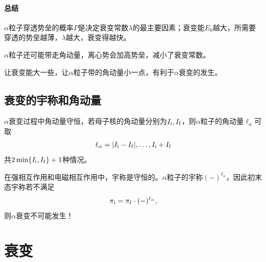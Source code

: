 \paragraph{总结}
\begin{compactenum}
	\item $\alpha$粒子穿透势垒的概率$P$是决定衰变常数$\lambda$的最主要因素；衰变能$E_0$越大，所需要穿透的势垒越薄，$\lambda$越大，衰变得越快。
	\item $\alpha$粒子还可能带走角动量，离心势会加高势垒，减小了衰变常数。
\end{compactenum}
让衰变能大一些，让$\alpha$粒子带的角动量小一点，有利于$\alpha$衰变的发生。

\subsection{\textalpha 衰变的宇称和角动量}

$\alpha$衰变过程中角动量守恒，若母子核的角动量分别为$I_{\mathrm{i}},I_{\mathrm{f}}$，则$\alpha$粒子的角动量$\ell_\alpha$可取
\begin{align}
	\ell_\alpha=|I_{\mathrm{i}}-I_{\mathrm{f}}|,\ldots,I_{\mathrm{i}}+I_{\mathrm{f}}
\end{align}
共$2\min\{I_{\mathrm{i}},I_{\mathrm{f}}\}+1$种情况。

在强相互作用和电磁相互作用中，宇称是守恒的。$\alpha$粒子的宇称$(-)^{\ell_\alpha}$，因此初末态宇称若不满足
\begin{align}
	\pi_{\mathrm{i}}=\pi_{\mathrm{f}}\cdot(-)^{\ell_\alpha},
\end{align}
则$\alpha$衰变不可能发生！

\section{\textbeta 衰变}

